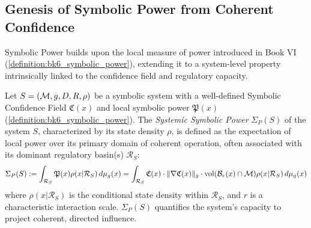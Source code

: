 \subsection{Genesis of Symbolic Power from Coherent Confidence}
\label{subsec:bk7_genesis_symbolic_power}
Symbolic Power builds upon the local measure of power introduced in Book VI (\ref{definition:bk6_symbolic_power}), extending it to a system-level property intrinsically linked to the confidence field and regulatory capacity.

\begin{definition}
\label{definition:bk7_systemic_symbolic_power}
Let \(S = (\mathcal{M}, g, D, R, \rho)\) be a symbolic system with a well-defined Symbolic Confidence Field \(\mathfrak{C}(x)\) and local symbolic power \(\mathfrak{P}(x)\) (\ref{definition:bk6_symbolic_power}). The \emph{Systemic Symbolic Power} \(\Sigma_P(S)\) of the system \(S\), characterized by its state density \(\rho\), is defined as the expectation of local power over its primary domain of coherent operation, often associated with its dominant regulatory basin(s) \(\mathcal{R}_S\):
\[
\Sigma_P(S) := \int_{\mathcal{R}_S} \mathfrak{P}(x) \rho(x|\mathcal{R}_S) \, d\mu_g(x) = \int_{\mathcal{R}_S} \mathfrak{C}(x) \cdot \|\nabla \mathfrak{C}(x)\|_{g} \cdot \text{vol}(\mathcal{B}_r(x) \cap \mathcal{M}) \rho(x|\mathcal{R}_S) \, d\mu_g(x)
\]
where \(\rho(x|\mathcal{R}_S)\) is the conditional state density within \(\mathcal{R}_S\), and \(r\) is a characteristic interaction scale. \(\Sigma_P(S)\) quantifies the system's capacity to project coherent, directed influence.
\end{definition}

